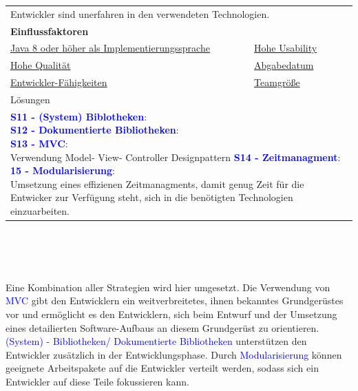 \documentclass[enabledeprecatedfontcommands,fontsize=11pt,paper=a4,twoside]{scrartcl}
\newcounter{one}
\newcommand{\cb}[1]{{\textcolor{blue}{#1}}}
\begin{document}
\begin{tabular} {|p{8cm} p{8cm}|}
	\hline
	\rowcolor{prob}\multicolumn{2}{|l|}{\parbox{16cm}{\textbf{05: Unerfahrene Entwickler}}} \\  \hline\hline 
	\multicolumn{2}{|l|}{\parbox{16cm}{Entwickler sind unerfahren in den verwendeten Technologien.}}\rule{0pt}{1ex}\\ [1ex] \hline
	\multicolumn{2}{|l|}{\textbf{Einflussfaktoren}}\\
	\hyperlink{b}{Java 8 oder höher als Implementierungssprache} &
	\hyperlink {g}{Hohe Usability}\\
	\hyperlink {h}{Hohe Qualität}&
	\hyperlink {uu}{Abgabedatum} \\
	\hyperlink {vv}{Entwickler-Fähigkeiten} &
	\hyperlink {xx}{Teamgröße} 
	\\ \hline
	\multicolumn{2}{|l|}{Lösungen} \\
	\multicolumn{2}{|l|}{\parbox{16cm}{
			\textbf{\cb{\hypertarget{ccc}{S11 - (System) Biblotheken}}}: \\
			\textbf{\cb{S12 - Dokumentierte Bibliotheken}}: \\
			\textbf{\cb{S13 - MVC}}: \\
			Verwendung Model- View- Controller Designpattern
			\textbf{\cb{S14 - Zeitmanagment}}: \\
			\textbf{\cb{15 - Modularisierung}}: \\
			Umsetzung eines effizienen Zeitmanagments, damit genug Zeit für die Entwicker zur Verfügung steht, sich in die benötigten Technologien einzuarbeiten.
	} }\\ [9ex] \hline
\end{tabular}\\ \\ \\
\begin{onehalfspace}
	Eine Kombination aller Strategien wird hier umgesetzt. Die Verwendung von \cb{MVC} gibt den Entwicklern ein weitverbreitetes, ihnen bekanntes Grundgerüstes vor und ermöglicht es den Entwicklern, sich beim Entwurf und der Umsetzung eines detailierten Software-Aufbaus an diesem Grundgerüst zu orientieren. \cb{(System) - Bibliotheken/ Dokumentierte Bibliotheken} unterstützen den Entwickler zusätzlich in der Entwicklungsphase.
	Durch \cb{Modularisierung} können geeignete Arbeitspakete auf die Entwickler verteilt werden, sodass sich ein Entwickler auf diese Teile fokussieren kann. \\ \\ \\ \\
\end{onehalfspace}
\end{document}
